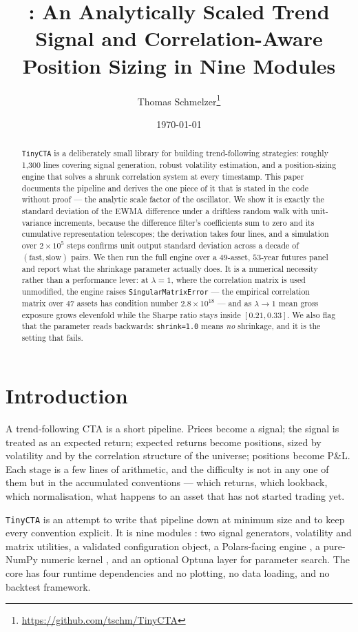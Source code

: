 \documentclass[11pt,a4paper]{article}
\title{\code{TinyCTA}: An Analytically Scaled Trend Signal and
Correlation-Aware Position Sizing in Nine Modules}
\author{Thomas Schmelzer\thanks{\url{https://github.com/tschm/TinyCTA}}}
\date{\today}
\newcommand{\code}[1]{\texttt{#1}}
\begin{document}
\maketitle

\begin{abstract}
\code{TinyCTA} is a deliberately small library for building trend-following
strategies: roughly 1{,}300 lines covering signal generation, robust volatility
estimation, and a position-sizing engine that solves a shrunk correlation system
at every timestamp. This paper documents the pipeline and derives the one piece
of it that is stated in the code without proof --- the analytic scale factor of
the oscillator. We show it is exactly the standard deviation of the EWMA
difference under a driftless random walk with unit-variance increments, because
the difference filter's coefficients sum to zero and its cumulative
representation telescopes; the derivation takes four lines, and a simulation over
$2 \times 10^5$ steps confirms unit output standard deviation across a decade of
$(\mathrm{fast}, \mathrm{slow})$ pairs. We then run the full engine over a
$49$-asset, $53$-year futures panel and report what the shrinkage parameter
actually does. It is a numerical necessity rather than a performance lever: at
$\lambda = 1$, where the correlation matrix is used unmodified, the engine raises
\code{SingularMatrixError} --- the empirical correlation matrix over $47$ assets
has condition number $2.8 \times 10^{18}$ --- and as $\lambda \to 1$ mean gross
exposure grows elevenfold while the Sharpe ratio stays inside $[0.21, 0.33]$.
We also flag that the parameter reads backwards: \code{shrink=1.0} means
\emph{no} shrinkage, and it is the setting that fails.
\end{abstract}

\section{Introduction}

A trend-following CTA is a short pipeline. Prices become a signal; the signal is
treated as an expected return; expected returns become positions, sized by
volatility and by the correlation structure of the universe; positions become
P\&L. Each stage is a few lines of arithmetic, and the difficulty is not in any
one of them but in the accumulated conventions --- which returns, which lookback,
which normalisation, what happens to an asset that has not started trading yet.

\code{TinyCTA} is an attempt to write that pipeline down at minimum size and to
keep every convention explicit. It is nine modules \citep{tinycta}: two signal
generators, volatility and matrix utilities, a validated configuration object, a
Polars-facing engine \citep{polars}, a pure-NumPy numeric kernel
\citep{harris2020}, and an optional Optuna \citep{akiba2019} layer for parameter
search. The core has four runtime dependencies and no plotting, no data loading,
and no backtest framework.
\end{document}
